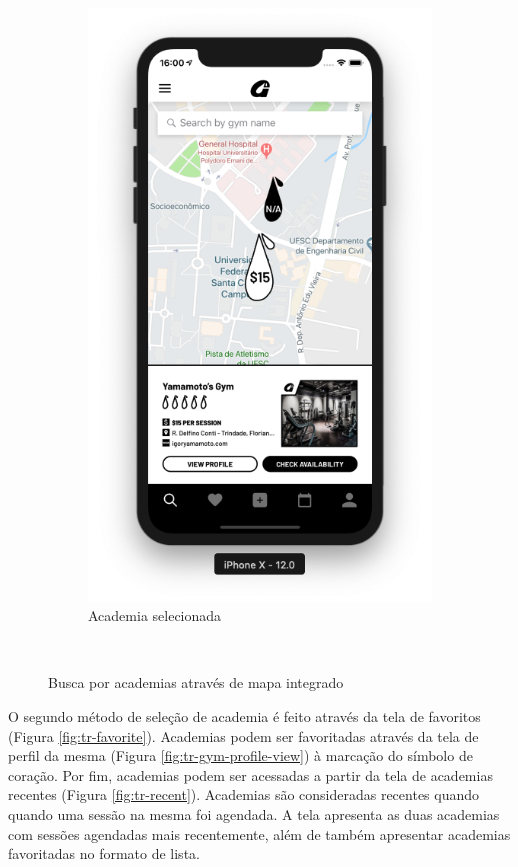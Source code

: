 \begin{figure}[H]
\begin{subfigure}[b]{0.3\textwidth}
        \includegraphics[width=\textwidth]{pfc/figuras/tr-home-map.png}
        \caption{Academia selecionada}
        \label{fig:tr-map-selected}
    \end{subfigure}
    ~
    \caption{Busca por academias através de mapa integrado}
    \label{fig:tr-gym-search}
\end{figure}

O segundo método de seleção de academia é feito através da tela de favoritos (Figura \ref{fig:tr-favorite}). Academias podem ser favoritadas através da tela de perfil da mesma (Figura \ref{fig:tr-gym-profile-view}) à marcação do símbolo de coração. Por fim, academias podem ser acessadas a partir da tela de academias recentes (Figura \ref{fig:tr-recent}). Academias são consideradas recentes quando quando uma sessão na mesma foi agendada. A tela apresenta as duas academias com sessões agendadas mais recentemente, além de também apresentar academias favoritadas no formato de lista.

